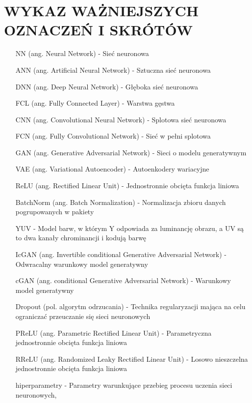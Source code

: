 \section*{WYKAZ WAŻNIEJSZYCH OZNACZEŃ I SKRÓTÓW}

  \bigskip

  \begin{itemize}
    \item[NN] (ang. Neural Network) - Sieć neuronowa
    \item[ANN] (ang. Artificial Neural Network) - Sztuczna sieć neuronowa
    \item[DNN] (ang. Deep Neural Network) - Głęboka sieć neuronowa
    \item[FCL] (ang. Fully Connected Layer) - Warstwa gęstwa
    \item[CNN] (ang. Convolutional Neural Network) - Splotowa sieć neuronowa
    \item[FCN] (ang. Fully Convolutional Network) - Sieć w pełni splotowa
    \item[GAN] (ang. Generative Adversarial Network) - Sieci o modelu generatywnym
    \item[VAE] (ang. Variational Autoencoder) - Autoenkodery wariacyjne
    \item[ReLU] (ang. Rectified Linear Unit) - Jednostronnie obcięta funkcja liniowa
    \item[BatchNorm] (ang. Batch Normalization) - Normalizacja zbioru danych
    pogrupowanych w pakiety
    \item[YUV] - Model barw, w którym Y odpowiada za luminancję obrazu, a UV
    są to dwa kanały chrominancji i kodują barwę
    \item[IcGAN] (ang. Invertible conditional Generative Adversarial Network) -
    Odwracalny warunkowy model generatywny
    \item[cGAN] (ang. conditional Generative Adversarial Network) - Warunkowy
    model generatywny
    \item[Dropout] (pol. algorytm odrzucania) - Technika
    regularyzacji mająca na celu ograniczać przeuczanie się sieci neuronowych
    \item[PReLU] (ang. Parametric Rectified Linear Unit) - Parametryczna
    jednostronnie obcięta funkcja liniowa
    \item[RReLU] (ang. Randomized Leaky Rectified Linear Unit) - Losowo nieszczelna
    jednostronnie obcięta funkcja liniowa
    \item[hiperparametry] - Parametry warunkujące przebieg procesu uczenia sieci neuronowych,

\end{itemize}
